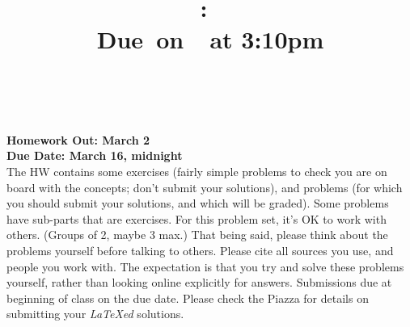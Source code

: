 \documentclass{article}
\title{    \vspace{2in}
    \textmd{\textbf{\hmwkClass:\ \hmwkTitle}}\\
    \normalsize\vspace{0.1in}\small{Due\ on\ \hmwkDueDate\ at 3:10pm}\\
    \vspace{0.1in}\large{\textit{\hmwkClassInstructor\ \hmwkClassTime}}
    \vspace{3in}
}
\author{\hmwkAuthorName}
\date{}
\theoremstyle{plain}
\newcommand{\hmwkAssignedDate}{March 2}
\newcommand{\hmwkDueDate}{March 16, midnight}
\begin{document}

\pagebreak

{\bf Homework Out: \hmwkAssignedDate}\\
{\bf Due Date:  \hmwkDueDate}\\

The HW contains some exercises (fairly simple problems to check you
are on board with the concepts; don’t submit your solutions), and
problems (for which you should submit your solutions, and which will
be graded). Some problems have sub-parts that are exercises.  For this
problem set, it’s OK to work with others. (Groups of 2, maybe 3 max.)
That being said, please think about the problems yourself before
talking to others. Please cite all sources you use, and people you
work with. The expectation is that you try and solve these problems
yourself, rather than looking online explicitly for
answers. Submissions due at beginning of class on the due date.
Please check the Piazza for details on submitting your \emph{LaTeXed}
solutions.
\end{document}
